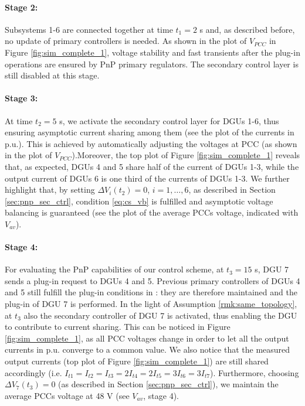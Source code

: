 \documentclass[a4paper]{article}
\theoremstyle{plain}
\begin{document}
\paragraph{Stage 2:}
Subsystems 1-6 are
	connected together at time $t_1 = 2$ s and, as described before, no update of primary controllers is needed. As shown in the plot of $V_{PCC}$ in Figure \ref{fig:sim_complete_1}, voltage stability and fast transients after the plug-in operations are ensured by PnP primary regulators. The secondary control layer is still disabled at this stage.

\paragraph{Stage 3:}
At time $t_2 = 5$ s, we activate the secondary control layer for DGUs 1-6, thus
ensuring asymptotic current sharing among them (see the plot of the currents in p.u.). This is achieved by automatically
adjusting the voltages at PCC (as shown in the plot of $V_{PCC}$).Moreover, the top plot of Figure \ref{fig:sim_complete_1} reveals that, as expected, DGUs 4 and 5 share half of the current of DGUs 1-3, while the output current of DGUs 6 is one third of the currents of DGUs 1-3. We further highlight that, by setting $\Delta V_i(t_{2}) = 0$, $i =
	1,\dots,6$, as described in Section \ref{sec:pnp_sec_ctrl}, condition
	\eqref{eq:cs_vb} is fulfilled and asymptotic voltage balancing is guaranteed (see the plot of the average PCCs voltage, indicated with $V_{av}$).
	
\paragraph{Stage 4:} For evaluating the PnP capabilities of our control scheme, at $t_3
=15$ s, DGU 7 sends a plug-in request to DGUs
4 and 5. Previous primary controllers of DGUs 4 and 5
still fulfill the plug-in conditions in \cite{tucci2015decentralized}: they are therefore maintained and the plug-in of DGU 7 is performed. In the light of Assumption \ref{rmk:same_topology}, at $t_3$ also the secondary controller of DGU 7 is activated, thus enabling the DGU to 
	contribute to current sharing. This can be noticed in Figure
\ref{fig:sim_complete_1}, as all PCC voltages change in order
to let all the output currents in p.u. converge to a common
value. We also notice that the measured output currents (top plot of Figure \ref{fig:sim_complete_1}) are still shared accordingly (i.e. $I_{t1} = I_{t2} = I_{t3} = 2I_{t4} = 2I_{t5} = 3I_{t6}= 3I_{t7}$). Furthermore, choosing $\Delta V_7(t_3) = 0$ (as described in
Section \ref{sec:pnp_sec_ctrl}), we maintain the average PCCs voltage at 48 V (see $V_{av}$, stage 4). 
\end{document}
